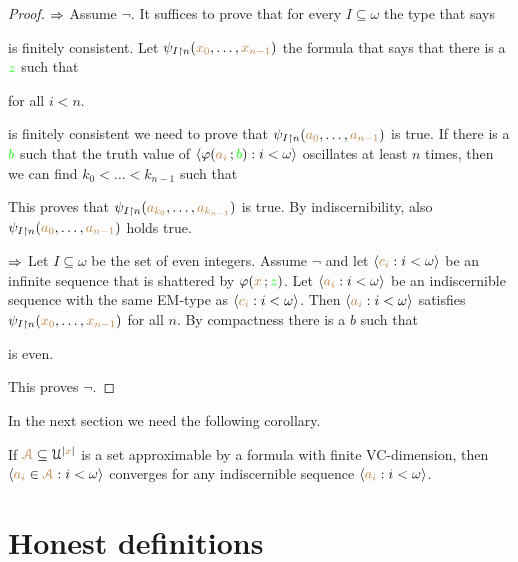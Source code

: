 \documentclass[creche.tex]{subfiles}
\begin{document}
\begin{proof}
$\Rightarrow$ Assume $\neg$. It suffices to prove that for every $I\subseteq\omega$ the type that says 


is finitely consistent. Let $\psi_{I\restriction n}({\color{brown} x_0},\dots,{\color{brown} x_{n-1}})$ the formula that says that there is a ${\color{green} z}$ such that

\quad for all $i<n$.

is finitely consistent we need to prove that $\psi_{I\restriction n}({\color{brown} a_0},\dots,{\color{brown} a_{n-1}})$ is true. If there is a ${\color{green} b}$ such that the truth value of $\langle\varphi({\color{brown} a_i}\,;{\color{green} b}):i<\omega\rangle$ oscillates at least $n$ times, then we can find $k_0<\dots<k_{n-1}$ such that 



This proves that $\psi_{I\restriction n}({\color{brown} a_{k_0}},\dots,{\color{brown} a_{k_{n-1}}})$ is true. By indiscernibility, also $\psi_{I\restriction n}({\color{brown} a_0},\dots,{\color{brown} a_{n-1}})$ holds true.

$\Rightarrow$ Let $I\subseteq\omega$ be the set of even integers. Assume $\neg$ and let  $\langle{\color{brown}c_i}:i<\omega\rangle$ be an infinite sequence that is shattered by $\varphi({\color{brown} x}\,;{\color{green} z})$.
Let  $\langle{\color{brown}a_i}:i<\omega\rangle$ be an indiscernible sequence with the same EM-type as $\langle{\color{brown}c_i}:i<\omega\rangle$. Then $\langle{\color{brown}a_i}:i<\omega\rangle$ satisfies $\psi_{I\restriction n}({\color{brown} x_0},\dots,{\color{brown} x_{n-1}})$ for all $n$. By compactness there is a $b$ such that

\quad is even.

This proves $\neg$.
\end{proof}

In the next section we need the following corollary.

\begin{corollary}\label{corol_altrank}
If ${\color{brown}{\EuScript A}}\subseteq\EuScript U^{|{\color{brown} x}|}$ is a set approximable by a formula with finite VC-dimension, then $\langle{\color{brown}a_i}\in{\color{brown}{\EuScript A}}:i<\omega\rangle$ converges for any indiscernible sequence $\langle{\color{brown}a_i}:i<\omega\rangle$.\QED
\end{corollary}


\section{Honest definitions}
\label{nip-theory}
\end{document}
